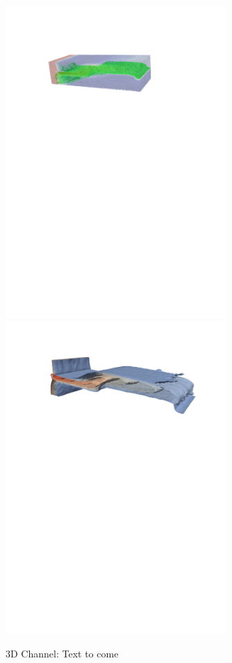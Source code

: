 \begin{landscape}
\begin{figure}[ht]
{{             \includegraphics[width=0.75\textwidth]{./Pics1/3D_ChannelAdaptive/Test_SlowNewAdapt_288_StreamLinesHoriz_b} 
      \hspace{.5cm} 
             \includegraphics[width=0.75\textwidth]{./Pics1/3D_ChannelAdaptive/Test_SlowNewAdapt_288_Isosurface_b} 
            }}
\caption{3D Channel: Text to come}
\end{figure}
\end{landscape}
\clearpage

